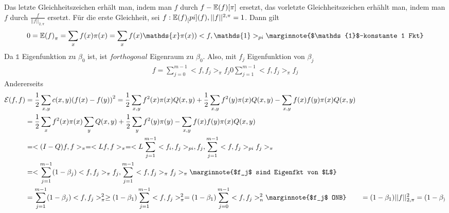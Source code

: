 \begin{beweis}
	Das letzte Gleichheitszeichen erhält man, indem man $f$ durch $f- \EW{f}[\pi]$  ersetzt, das vorletzte Gleichheitszeichen erhählt man, indem man $f$ durch $\frac{f}{||f||_{2,\pi}}$ ersetzt.
	Für die erste Gleichheit, sei $f: \EW{f}_[pi](f), ||f||^{2,\pi} = 1$. Dann gilt
	\begin{align}
		0 = \EW{f}_{\pi}= \sum\limits_{x}f(x)\pi(x) = \sum\limits_{x} f(x) \mathds{x} \pi(x) ) <f,\mathds{1}>_{pi} \marginnote{$\mathds{1}$-konstante 1 Fkt}
	\end{align}
	Da $\mathds{1}$ Eigenfunktion zu $\beta_0$ ist, ist $f orthogonal$ Eigenraum zu $\beta_0$. Also, mit $f_j$ Eigenfunktion von $\beta_j$
	\begin{align}
		f = \sum\limits_{j = 0}^{m-1}<f,f_j>_{\pi}f_j 0 \sum\limits_{j = 1}^{m-1}<f,f_j>_{\pi} f_j 
	\end{align}
	Andererseits
	\begin{align}
		\mathcal{E}(f,f) &= \frac{1}{2} \sum\limits_{x,y}c(x,y) \enb{f(x) - f(y)}^2 = \frac{1}{2} \sum\limits_{x,y}f^2(x) \pi(x) Q(x,y) + \frac{1}{2} \sum\limits_{x,y} f^2(y) \pi(x) Q(x,y) - \sum\limits_{x,y} f(x)f(y)\pi(x) Q(x,y) \\
		&= \frac{1}{2} \sum\limits_{x}f^2(x) \pi(x) \sum\limits_{y} Q (x,y) + \frac{1}{2} \sum\limits_{y} f^2(y) \pi(y) - \sum\limits_{x,y}f(x) f(y) \pi(x) Q(x,y) \\
		&= <(I-Q)f,f >_{\pi} = <Lf,f>_{\pi} = <L\sum\limits_{j=1}^{m-1}<f_i,f_j>_{pi},f_j, \sum\limits_{j=1}^{m-1}<f,f_j>_{pi}f_j>_{\pi} \\
		&= <\sum\limits_{j=1}^{m-1}(1-\beta_j)<f,f_j>_{\pi}f_j,\sum\limits_{j=1}^{m-1}<f,f_j>_{\pi}f_j>_{\pi} \marginnote{$f_j$ sind Eigenfkt von $L$} \\
		&= \sum\limits_{j = 1}^{m-1}(1-\beta_j)<f,f_j>^2_{\pi}\geq \enb{1-\beta_1} \sum\limits_{j = 1}^{m-1}<f,f_j>^2_{\pi}  =\enb{1-\beta_1} \sum\limits_{j = 0}^{m-1}<f,f_j>^2_n \marginnote{$f_j$ ONB}
		&= \enb{1- \beta_1} ||f||^2_{2,\pi} = (1-\beta_)
	\end{align}
\end{beweis}

